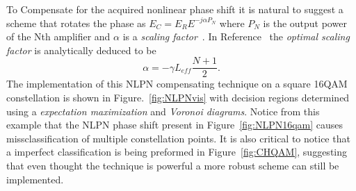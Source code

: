 To Compensate for the acquired nonlinear phase shift it is natural to suggest a scheme that rotates the phase as $E_{C}=E_{R}E^{-j\alpha P_{N}}$ where  $P_{N}$ is the output power of the Nth amplifier and $\alpha$ is a \textit{scaling factor}~\cite{liu2002improving}. In Reference~\cite{NLPNDSP} the \textit{optimal scaling factor} is analytically deduced to be 
\begin{equation}
\alpha=-\gamma L_{eff}\frac{N+1}{2}.
\end{equation}
 The implementation of this NLPN compensating technique on a square 16QAM constellation is shown in Figure.~\ref{fig:NLPNvis} with decision regions determined using a \textit{expectation maximization} and \textit{Voronoi diagrams}. Notice from this example that the NLPN phase shift present in Figure~\ref{fig:NLPN16qam} causes missclassification of multiple constellation points. It is also critical to notice that a imperfect classification is being preformed in Figure~\ref{fig:CHQAM}, suggesting that even thought the technique is powerful a more robust scheme can still be implemented. ~\\



